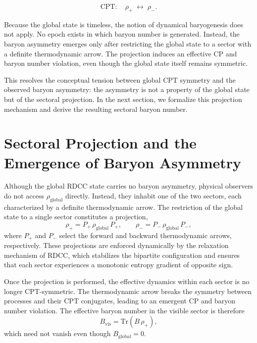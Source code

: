\documentclass[11pt,a4paper]{article}
\newcommand{\rglobal}{\rho_{\mathrm{global}}}
\newcommand{\rplus}{\rho_{+}}
\newcommand{\rminus}{\rho_{-}}
\newcommand{\Trm}{\mathrm{Tr}}
\begin{document}
\[
\mathrm{CPT}:\quad \rplus \;\longleftrightarrow\; \rminus.
\]



Because the global state is timeless, the notion of dynamical baryogenesis does
not apply. No epoch exists in which baryon number is generated. Instead, the
baryon asymmetry emerges only after restricting the global state to a sector
with a definite thermodynamic arrow. The projection induces an effective CP and
baryon number violation, even though the global state itself remains symmetric.

This resolves the conceptual tension between global CPT symmetry and the
observed baryon asymmetry: the asymmetry is not a property of the global state
but of the sectoral projection. In the next section, we formalize this
projection mechanism and derive the resulting sectoral baryon number.


\section{Sectoral Projection and the Emergence of Baryon Asymmetry}

Although the global RDCC state carries no baryon asymmetry, physical observers
do not access $\rglobal$ directly. Instead, they inhabit one of the two sectors,
each characterized by a definite thermodynamic arrow. The restriction of the
global state to a single sector constitutes a projection,
\begin{equation}
\rplus = P_{+}\,\rglobal\,P_{+}, 
\qquad
\rminus = P_{-}\,\rglobal\,P_{-},
\end{equation}
where $P_{+}$ and $P_{-}$ select the forward and backward thermodynamic arrows,
respectively. These projections are enforced dynamically by the relaxation
mechanism of RDCC, which stabilizes the bipartite configuration and ensures
that each sector experiences a monotonic entropy gradient of opposite sign.

Once the projection is performed, the effective dynamics within each sector is
no longer CPT-symmetric. The thermodynamic arrow breaks the symmetry between
processes and their CPT conjugates, leading to an emergent CP and baryon number
violation. The effective baryon number in the visible sector is therefore
\begin{equation}
B_{\mathrm{vis}} = \Trm\!\left(B\,\rplus\right),
\end{equation}
which need not vanish even though $B_{\mathrm{global}} = 0$.
\end{document}

